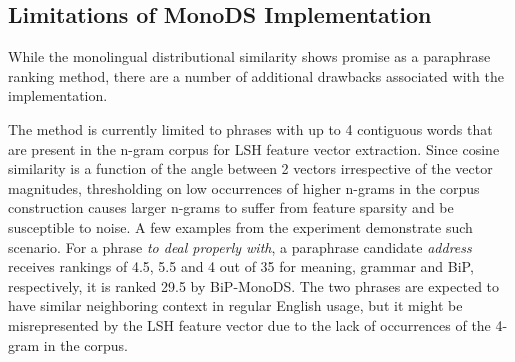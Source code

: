 \documentclass[11pt]{article}
\newcommand{\mnote}[1]{\marginpar{\raggedleft\footnotesize\itshape#1}}
\begin{document}
{{%
\subsection{Limitations of MonoDS Implementation}%

While the monolingual distributional similarity shows promise as a paraphrase ranking method, there are a number of additional drawbacks associated with the implementation.%

The method is currently limited to phrases with up to 4 contiguous words that are present in the n-gram corpus for LSH feature vector extraction. Since cosine similarity is a function of the angle between 2 vectors irrespective of the vector magnitudes, thresholding on low occurrences of higher n-grams in the corpus construction causes larger n-grams to suffer from feature sparsity and be susceptible to noise. A few examples from the experiment demonstrate such scenario. For a phrase \emph{to deal properly with}, a paraphrase candidate \emph{address} receives rankings of 4.5, 5.5 and 4 out of 35 for meaning, grammar and BiP, respectively, it is ranked 29.5 by BiP-MonoDS. The two phrases are expected to have similar neighboring context in regular English usage, but it might be misrepresented by the LSH feature vector due to the lack of occurrences of the 4-gram in the corpus.

}}
\end{document}

